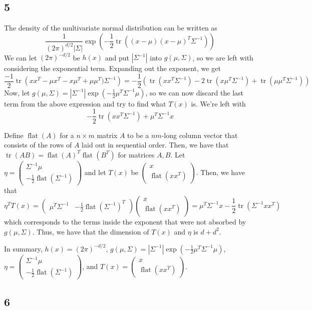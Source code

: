 \documentclass{article}
\newcommand{\openm}{\begin{pmatrix}}
\newcommand{\closem}{\end{pmatrix}}
\DeclareMathOperator{\tr}{tr}
\DeclareMathOperator{\flatv}{flat}
\begin{document}
\subsection*{5}
The density of the multivariate normal distribution can be written as 
\[\frac{1}{(2\pi)^{d/2}|\Sigma|}\exp\left(-\frac{1}{2}\tr\left((x-\mu)(x-\mu)^T\Sigma^{-1}\right)\right)\]
We can let $(2\pi)^{-d/2}$ be $h(x)$ and put $|\Sigma^{-1}|$ into $g(\mu, \Sigma)$, so we are left with considering the exponential term. Expanding out the exponent, we get
\[\frac{-1}{2}\tr\left(xx^T-\mu x^T-x\mu^T+\mu\mu^T)\Sigma^{-1}\right)=-\frac{1}{2}\left(\tr(xx^T\Sigma^{-1})-2\tr(x\mu^T\Sigma^{-1})+\tr(\mu\mu^T\Sigma^{-1})\right)\]
Now, let $g(\mu,\Sigma)=|\Sigma^{-1}|\exp\left(-\frac{1}{2}\mu^T\Sigma^{-1}\mu\right)$, so we can now discard the last term from the above expression and try to find what $T(x)$ is. We're left with
\[-\frac{1}{2}\tr(xx^T\Sigma^{-1})+\mu^T\Sigma^{-1}x\]

Define $\flatv(A)$ for a $n\times m$ matrix $A$ to be a $nm$-long column vector that consists of the rows of $A$ laid out in sequential order. Then, we have that $\tr(AB)=\flatv(A)^T\flatv(B^T)$ for matrices $A,B$. Let $\eta=\openm\Sigma^{-1}\mu\\-\frac{1}{2}\flatv(\Sigma^{-1})\closem$ and let $T(x)$ be $\openm x\\\flatv(xx^T)\closem$. Then, we have that
\[\eta^TT(x)=\openm\mu^T\Sigma^{-1}&-\frac{1}{2}\flatv(\Sigma^{-1})^T\closem\openm x\\\flatv(xx^T)\closem=\mu^T\Sigma^{-1}x-\frac{1}{2}\tr(\Sigma^{-1}xx^T)\]
which corresponds to the terms inside the exponent that were not absorbed by $g(\mu,\Sigma)$. Thus, we have that the dimension of $T(x)$ and $\eta$ is $d+d^2$.

In summary, $h(x)=(2\pi)^{-d/2}$, $g(\mu,\Sigma)=|\Sigma^{-1}|\exp\left(-\frac{1}{2}\mu^T\Sigma^{-1}\mu\right)$, $\eta=\openm\Sigma^{-1}\mu\\-\frac{1}{2}\flatv(\Sigma^{-1})\closem$, and $T(x)=\openm x\\\flatv(xx^T)\closem$.
\subsection*{6}
\end{document}
